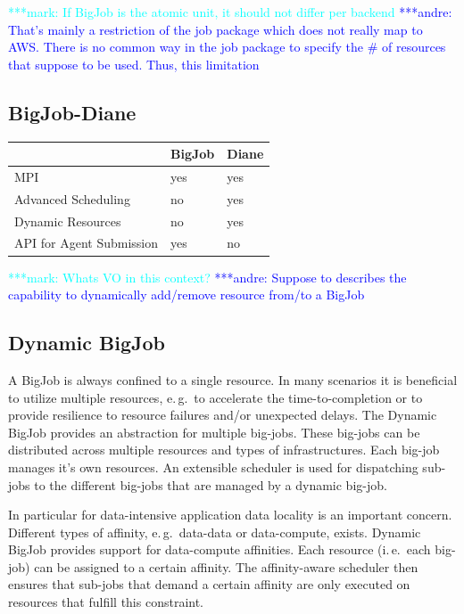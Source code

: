 \documentclass[]{article}
\newcommand{\alnote}[1]{ {\textcolor{blue} { ***andre: #1 }}}
\newcommand{\msnote}[1]{ {\textcolor{cyan} { ***mark: #1 }}}
\newcommand{\alnote}[1]{}
\begin{document}
\msnote{If BigJob is the atomic unit, it should not differ per
backend}\alnote{That's mainly a restriction of the job package which does not
really map to AWS. There is no common way in the job package to specify the \#
of resources that suppose to be used. Thus, this limitation}


\subsection{BigJob-Diane}

\begin{tabular}{|l|l|l|}
\hline
 &BigJob &Diane\\
\hline
MPI &yes &yes\\
\hline
Advanced Scheduling &no &yes\\
\hline
Dynamic Resources &no &yes\\
\hline
API for Agent Submission &yes &no\\
\hline
\end{tabular}

\msnote{Whats VO in this context?}\alnote{Suppose to describes the capability to dynamically add/remove resource from/to a BigJob}



\subsection{Dynamic BigJob}

A BigJob is always confined to a single resource. In many scenarios it is
beneficial to utilize multiple resources, e.\,g.\ to accelerate the
time-to-completion or to provide resilience to resource failures and/or
unexpected delays. The Dynamic BigJob provides an abstraction for multiple
big-jobs. These big-jobs can be distributed across multiple resources and types
of infrastructures. Each big-job manages it's own resources. An extensible
scheduler is used for dispatching sub-jobs to the different big-jobs that are
managed by a dynamic big-job.



In particular for data-intensive application data locality is an important
concern. Different types of affinity, e.\,g.\ data-data or data-compute, exists.
Dynamic BigJob provides support for data-compute affinities. Each resource
(i.\,e.\ each big-job) can be assigned to a certain affinity. The affinity-aware
scheduler then ensures that sub-jobs that demand a certain affinity are only
executed on resources that fulfill this constraint.
\end{document}
